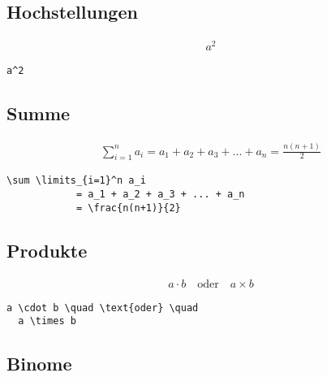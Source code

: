 \subsection{Hochstellungen}\label{hochstellungen}

\begin{align}
  a^2
\end{align}

\lstset{language=[LaTeX]TeX } %
\begin{lstlisting}[gobble=2, frame=none, numbers=none, backgroundcolor=\color{white},%
	caption={},label={code:}]
	a^2
\end{lstlisting}


\subsection{Summe}\label{summe}

\begin{align}
  \sum \limits_{i=1}^n a_i
		= a_1 + a_2 + a_3 + ... + a_n
		= \frac{n(n+1)}{2}
\end{align}

\lstset{language=[LaTeX]TeX } %
\begin{lstlisting}[gobble=2, frame=none, numbers=none, backgroundcolor=\color{white},%
	caption={},label={code:}]
	\sum \limits_{i=1}^n a_i
			= a_1 + a_2 + a_3 + ... + a_n
			= \frac{n(n+1)}{2}
\end{lstlisting}


\subsection{Produkte}\label{produkte}

\begin{align}
  a \cdot b \quad \text{oder} \quad
  a \times b
\end{align}

\lstset{language=[LaTeX]TeX } %
\begin{lstlisting}[gobble=2, frame=none, numbers=none, backgroundcolor=\color{white},%
	caption={},label={code:}]
	a \cdot b \quad \text{oder} \quad
  a \times b
\end{lstlisting}


\subsection{Binome}\label{binome}

